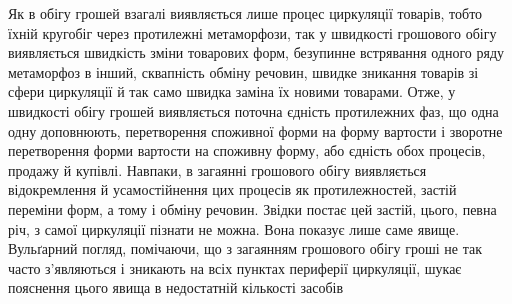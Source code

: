 Як в обігу грошей взагалі виявляється лише процес циркуляції
товарів, тобто їхній кругобіг через протилежні метаморфози,
так у швидкості грошового обігу виявляється швидкість зміни
товарових форм, безупинне встрявання одного ряду метаморфоз
в інший, сквапність обміну речовин, швидке зникання товарів
зі сфери циркуляції й так само швидка заміна їх новими товарами.
Отже, у швидкості обігу грошей виявляється поточна єдність
протилежних фаз, що одна одну доповнюють, перетворення
споживної форми на форму вартости і зворотне перетворення
форми вартости на споживну форму, або єдність обох процесів,
продажу й купівлі. Навпаки, в загаянні грошового обігу виявляється
відокремлення й усамостійнення цих процесів як протилежностей,
застій переміни форм, а тому і обміну речовин. Звідки
постає цей застій, цього, певна річ, з самої циркуляції пізнати
не можна. Вона показує лише саме явище. Вульґарний погляд,
помічаючи, що з загаянням грошового обігу гроші не так часто
з’являються і зникають на всіх пунктах периферії циркуляції,
шукає пояснення цього явища в недостатній кількості засобів
